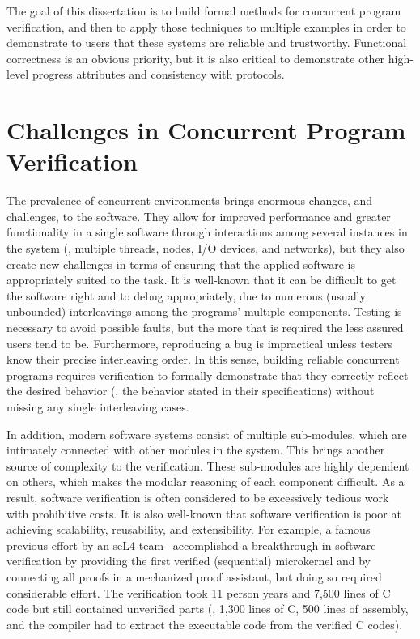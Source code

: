 The goal of this dissertation is to build formal methods for concurrent program verification, 
and then to apply those techniques to multiple examples in order to demonstrate to users that these systems are reliable and trustworthy. 
 Functional correctness is an obvious priority, but it is also critical to demonstrate other high-level progress attributes and consistency with protocols. 

\section{Challenges in Concurrent Program Verification}
\label{chapter:introduction:sec:challenges-in-concurrent-program-verification}

The prevalence of concurrent environments brings enormous changes, and challenges, to the software. 
They allow for improved performance and greater functionality in a single software 
through interactions among several instances in the system (\ie, multiple threads, nodes, I/O devices, and networks), 
but they also create new challenges in terms of ensuring that the applied software is appropriately suited to the task. 
It is well-known that it can be difficult to get the software right and to debug appropriately, 
due to numerous (usually unbounded) interleavings among the programs’ multiple components. 
Testing is necessary to avoid possible faults, but the more that is required the less assured users tend to be. 
Furthermore, reproducing a bug is impractical unless testers know their precise interleaving order. 
In this sense, building reliable concurrent programs requires verification to formally demonstrate 
that they correctly reflect the desired behavior (\ie, the behavior stated in their specifications) without missing any single interleaving cases. 

In addition, modern software systems consist of multiple sub-modules, which are intimately connected with other modules in the system. 
This brings another source of complexity to the verification. 
These sub-modules are highly dependent on others, which makes the modular reasoning of each component difficult. 
As a result, software verification is often considered to be excessively tedious work with prohibitive costs.
It is also well-known that software verification is poor at achieving scalability, reusability, and extensibility.
For example, a famous previous effort by an seL4 team~\cite{klein2009sel4} accomplished a breakthrough in software verification 
by providing the first verified (sequential) microkernel and by connecting all proofs in a mechanized proof assistant, 
but doing so required considerable effort. 
The verification took 11 person years and 7,500 lines of C code but still contained 
unverified parts (\ie, 1,300 lines of C, 500 lines of assembly, and the compiler had to extract the executable code from the verified C codes). 

